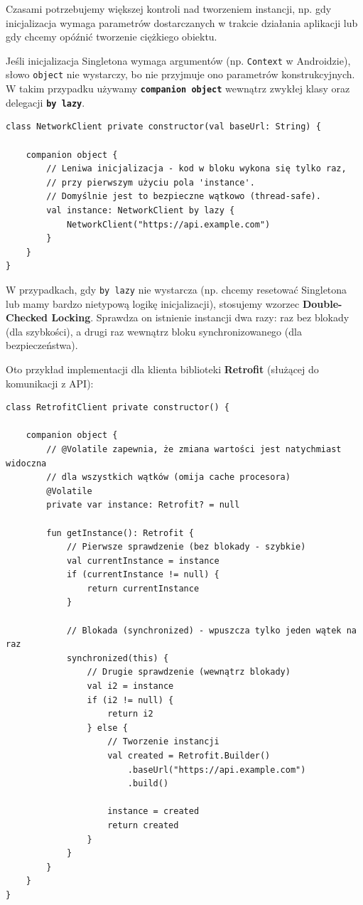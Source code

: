 Czasami potrzebujemy większej kontroli nad tworzeniem instancji, np. gdy inicjalizacja wymaga parametrów dostarczanych w trakcie działania aplikacji lub gdy chcemy opóźnić tworzenie ciężkiego obiektu.

Jeśli inicjalizacja Singletona wymaga argumentów (np. \texttt{Context} w Androidzie), słowo \texttt{object} nie wystarczy, bo nie przyjmuje ono parametrów konstrukcyjnych. W takim przypadku używamy \textbf{\texttt{companion object}} wewnątrz zwykłej klasy oraz delegacji \textbf{\texttt{by lazy}}.

\begin{verbatim}
class NetworkClient private constructor(val baseUrl: String) {
    
    companion object {
        // Leniwa inicjalizacja - kod w bloku wykona się tylko raz,
        // przy pierwszym użyciu pola 'instance'.
        // Domyślnie jest to bezpieczne wątkowo (thread-safe).
        val instance: NetworkClient by lazy {
            NetworkClient("https://api.example.com")
        }
    }
}
\end{verbatim}

W przypadkach, gdy \texttt{by lazy} nie wystarcza (np. chcemy resetować Singletona lub mamy bardzo nietypową logikę inicjalizacji), stosujemy wzorzec \textbf{Double-Checked Locking}.
 Sprawdza on istnienie instancji dwa razy: raz bez blokady (dla szybkości), a drugi raz wewnątrz bloku synchronizowanego (dla bezpieczeństwa).

Oto przykład implementacji dla klienta biblioteki \textbf{Retrofit} (służącej do komunikacji z API):

\begin{verbatim}
class RetrofitClient private constructor() {

    companion object {
        // @Volatile zapewnia, że zmiana wartości jest natychmiast widoczna 
        // dla wszystkich wątków (omija cache procesora)
        @Volatile
        private var instance: Retrofit? = null

        fun getInstance(): Retrofit {
            // Pierwsze sprawdzenie (bez blokady - szybkie)
            val currentInstance = instance
            if (currentInstance != null) {
                return currentInstance
            }

            // Blokada (synchronized) - wpuszcza tylko jeden wątek na raz
            synchronized(this) {
                // Drugie sprawdzenie (wewnątrz blokady)
                val i2 = instance
                if (i2 != null) {
                    return i2
                } else {
                    // Tworzenie instancji
                    val created = Retrofit.Builder()
                        .baseUrl("https://api.example.com")
                        .build()
                    
                    instance = created
                    return created
                }
            }
        }
    }
}
\end{verbatim}

